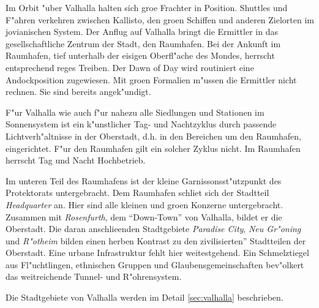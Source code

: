 
Im Orbit "uber Valhalla halten sich gro\3e Frachter in Position. Shuttles und F"ahren verkehren zwischen Kallisto, den gro\3en Schiffen und anderen Zielorten im jovianischen System. Der Anflug auf Valhalla bringt die Ermittler in das gesellschaftliche Zentrum der Stadt, den Raumhafen. Bei der Ankunft im Raumhafen, tief unterhalb der eisigen Oberfl"ache des Mondes, herrscht entsprechend reges Treiben. Der Dawn of Day wird routiniert eine Andockposition zugewiesen. Mit gro\3en Formalien m"ussen die Ermittler nicht rechnen. Sie sind bereits angek"undigt.

F"ur Valhalla wie auch f"ur nahezu alle Siedlungen und Stationen im Sonnensystem ist ein k"unstlicher Tag- und Nachtzyklus durch passende Lichtverh"altnisse in der Oberstadt, d.h. in den Bereichen um den Raumhafen, eingerichtet. F"ur den Raumhafen gilt ein solcher Zyklus nicht. Im Raumhafen herrscht Tag und Nacht Hochbetrieb.

Im unteren Teil des Raumhafens ist der kleine Garnissonsst"utzpunkt des Protektorats untergebracht. Dem Raumhafen schlie\3t sich der Stadtteil \emph{Headquarter} an. Hier sind alle kleinen und gro\3en Konzerne untergebracht. Zusammen mit \emph{Rosenfurth}, dem ``Down-Town'' von Valhalla, bildet er die Oberstadt. Die daran anschlie\3enden Stadtgebiete \emph{Paradise City}, \emph{Neu Gr"oning} und \emph{R"otheim} bilden einen herben Kontrast zu den zivilisierten'' Stadtteilen der Oberstadt. Eine urbane Infrastruktur fehlt hier weitestgehend. Ein Schmelztiegel aus Fl"uchtlingen, ethnischen Gruppen und Glaubensgemeinschaften bev"olkert das weitreichende Tunnel- und R"ohrensystem.

\begin{remarks}
    Die Stadtgebiete von Valhalla werden im Detail \cref{sec:valhalla} beschrieben.
\end{remarks}
